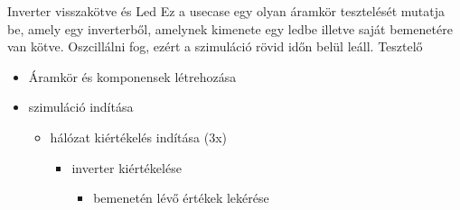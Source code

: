 \newpage

\usecase
{Inverter visszakötve és Led}
{Ez a usecase egy olyan áramkör tesztelését mutatja be, amely egy inverterből, amelynek kimenete egy ledbe illetve saját bemenetére van kötve. Oszcillálni fog, ezért a szimuláció rövid időn belül leáll.}
{Tesztelő}
{\vspace{-15pt}
\begin{itemize}
\setlength{\itemsep}{0cm}%
\setlength{\parskip}{0cm}%
\item Áramkör és komponensek létrehozása
\item szimuláció indítása
\begin{itemize}
\setlength{\itemsep}{0cm}%
\setlength{\parskip}{0cm}%
\item hálózat kiértékelés indítása (3x)
\begin{itemize}
\setlength{\itemsep}{0cm}%
\setlength{\parskip}{0cm}%
\item inverter kiértékelése
\begin{itemize}
\setlength{\itemsep}{0cm}%
\setlength{\parskip}{0cm}%
\item bemenetén lévő értékek lekérése

\end{itemize}
\end{itemize}
\end{itemize}
\end{itemize}}

